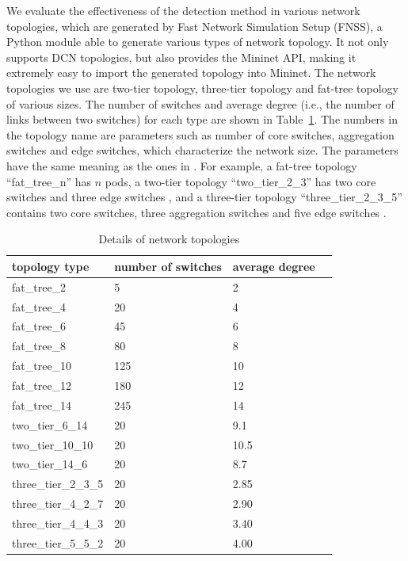 We evaluate the effectiveness of the detection method in various network topologies, which are generated by Fast Network Simulation Setup (FNSS), a Python module able to generate various types of network topology. It not only supports DCN topologies, but also provides the Mininet API, making it extremely easy to import the generated topology into Mininet. The network topologies we use are two-tier topology, three-tier topology and fat-tree topology of various sizes. The number of switches and average degree (i.e., the number of links between two switches) for each type are shown in Table~\ref{table:network_env}. The numbers in the topology name are parameters such as number of core switches, aggregation switches and edge switches, which characterize the network size. The parameters have the same meaning as the ones in \cite{FNSS}. For example, a fat-tree topology ``fat\_tree\_n'' has $n$ pods, a two-tier topology ``two\_tier\_2\_3'' has two core switches and three edge switches , and a three-tier topology ``three\_tier\_2\_3\_5'' contains two core switches, three aggregation switches and five edge switches .

\begin{table}[H]
\centering
\caption{Details of network topologies}
\begin{tabular}{|l|l|l|l|}
\hline topology type & number of switches & average degree \\
\hline
\hline fat\_tree\_2 & 5 & 2 \\
\hline fat\_tree\_4 & 20 & 4 \\
\hline fat\_tree\_6 & 45 & 6 \\
\hline fat\_tree\_8 & 80 & 8 \\
\hline fat\_tree\_10 & 125 & 10 \\
\hline fat\_tree\_12 & 180 & 12 \\
\hline fat\_tree\_14 & 245 & 14 \\
\hline two\_tier\_6\_14 & 20 & 9.1 \\
\hline two\_tier\_10\_10 & 20 & 10.5 \\
\hline two\_tier\_14\_6 & 20 & 8.7 \\
\hline three\_tier\_2\_3\_5 & 20 & 2.85 \\
\hline three\_tier\_4\_2\_7 & 20 & 2.90 \\
\hline three\_tier\_4\_4\_3 & 20 & 3.40 \\
\hline three\_tier\_5\_5\_2 & 20 & 4.00 \\
\hline 
\end{tabular}
\label{table:network_env}
\end{table}

